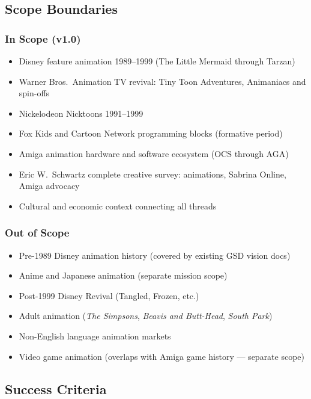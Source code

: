 \documentclass[11pt,letterpaper]{article}
\begin{document}
\subsection{Scope Boundaries}

\subsubsection{In Scope (v1.0)}
\begin{itemize}[leftmargin=2em]
  \item Disney feature animation 1989--1999 (The Little Mermaid through Tarzan)
  \item Warner Bros.\ Animation TV revival: Tiny Toon Adventures, Animaniacs and spin-offs
  \item Nickelodeon Nicktoons 1991--1999
  \item Fox Kids and Cartoon Network programming blocks (formative period)
  \item Amiga animation hardware and software ecosystem (OCS through AGA)
  \item Eric W.\ Schwartz complete creative survey: animations, Sabrina Online, Amiga advocacy
  \item Cultural and economic context connecting all threads
\end{itemize}

\subsubsection{Out of Scope}
\begin{itemize}[leftmargin=2em]
  \item Pre-1989 Disney animation history (covered by existing GSD vision docs)
  \item Anime and Japanese animation (separate mission scope)
  \item Post-1999 Disney Revival (Tangled, Frozen, etc.)
  \item Adult animation (\textit{The Simpsons}, \textit{Beavis and Butt-Head}, \textit{South Park})
  \item Non-English language animation markets
  \item Video game animation (overlaps with Amiga game history --- separate scope)
\end{itemize}

\subsection{Success Criteria}
\end{document}
